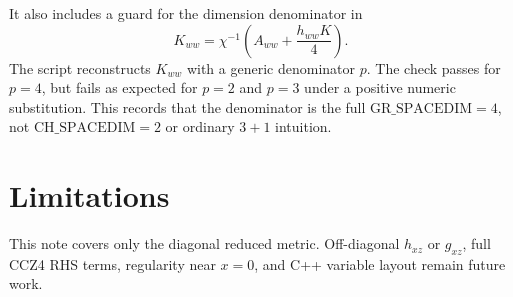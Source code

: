 \documentclass[11pt]{article}
\begin{document}
It also includes a guard for the dimension denominator in
\begin{equation}
  K_{ww}
  =
  \chi^{-1}
  \left(A_{ww}+\frac{h_{ww}K}{4}\right).
\end{equation}
The script reconstructs \(K_{ww}\) with a generic denominator \(p\). The
check passes for \(p=4\), but fails as expected for \(p=2\) and \(p=3\) under
a positive numeric substitution. This records that the denominator is the full
\(\mathrm{GR\_SPACEDIM}=4\), not \(\mathrm{CH\_SPACEDIM}=2\) or ordinary
\(3+1\) intuition.

\section{Limitations}

This note covers only the diagonal reduced metric. Off-diagonal \(h_{xz}\) or
\(g_{xz}\), full CCZ4 RHS terms, regularity near \(x=0\), and C++ variable
layout remain future work.
\end{document}
